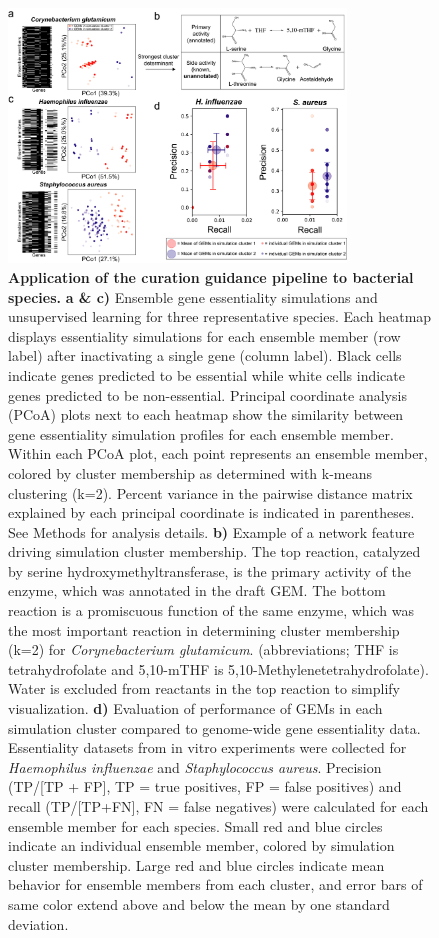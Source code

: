 \documentclass[11pt,twocolumn,notitlepage,openany,twoside]{book}
\begin{document}
\begin{refsection}
\begin{figure}
\centering
\includegraphics[width=0.8\textwidth]{ch3_fig3}
\caption[ Application of the curation guidance pipeline to bacterial species.]{\textbf{ Application of the curation guidance pipeline to bacterial species.}  \textbf{a \& c)} Ensemble gene essentiality simulations and unsupervised learning for three representative species. Each heatmap displays essentiality simulations for each ensemble member (row label) after inactivating a single gene (column label). Black cells indicate genes predicted to be essential while white cells indicate genes predicted to be non-essential. Principal coordinate analysis (PCoA) plots next to each heatmap show the similarity between gene essentiality simulation profiles for each ensemble member. Within each PCoA plot, each point represents an ensemble member, colored by cluster membership as determined with k-means clustering (k=2). Percent variance in the pairwise distance matrix explained by each principal coordinate is indicated in parentheses. See Methods for analysis details. \textbf{b)} Example of a network feature driving simulation cluster membership. The top reaction, catalyzed by serine hydroxymethyltransferase, is the primary activity of the enzyme, which was annotated in the draft GEM. The bottom reaction is a promiscuous function of the same enzyme, which was the most important reaction in determining cluster membership (k=2) for \textit{Corynebacterium glutamicum}. (abbreviations; THF is tetrahydrofolate and 5,10-mTHF is 5,10-Methylenetetrahydrofolate). Water is excluded from reactants in the top reaction to simplify visualization. \textbf{d)} Evaluation of performance of GEMs in each simulation cluster compared to genome-wide gene essentiality data. Essentiality datasets from in vitro experiments were collected for \textit{Haemophilus influenzae} and \textit{Staphylococcus aureus}. Precision (TP/[TP + FP], TP = true positives, FP = false positives) and recall (TP/[TP+FN], FN = false negatives) were calculated for each ensemble member for each species. Small red and blue circles indicate an individual ensemble member, colored by simulation cluster membership. Large red and blue circles indicate mean behavior for ensemble members from each cluster, and error bars of same color extend above and below the mean by one standard deviation.}
\end{figure}


\end{refsection}
\end{document}
